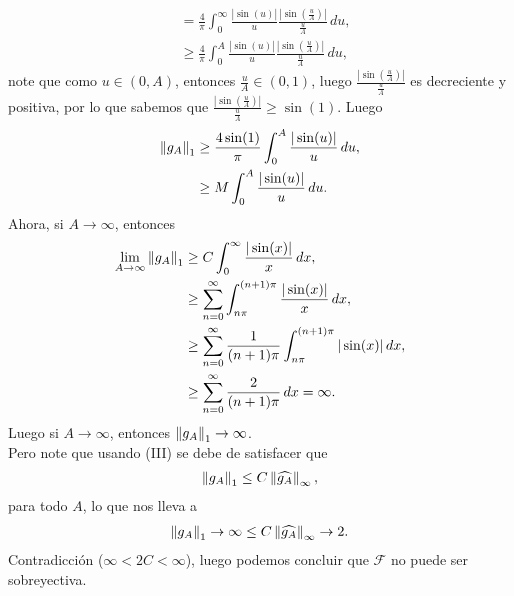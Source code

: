 \begin{homeworkProblem}
\begin{solution}
\begin{enumerate}[(i)]
\begin{align*}
          &=\frac{4}{\pi} \int_{0}^{\infty}\frac{|\sin(u)|}{u}\frac{\left| \sin(\frac{u}{A}) \right|}{\frac{u}{A}}\, du,\\
          &\geq \frac{4}{\pi}\int_{0}^{A}\frac{|\sin(u)|}{u}\frac{\left| \sin(\frac{u}{A}) \right|}{\frac{u}{A}}\, du,
        \end{align*}
        note que como $u\in (0,A)$, entonces $\frac{u}{A}\in(0,1)$, luego $\frac{|\sin\left( \frac{u}{A} \right)|}{\frac{u}{A}}$ es decreciente y positiva, por lo que sabemos que $\frac{|\sin\left( \frac{u}{A} \right)|}{\frac{u}{A}}\geq \sin(1)$. Luego
        \begin{align*}
          \left\|g_A\right\|_{1}&\geq \frac{4\sin(1)}{\pi}\int_{0}^{A}\frac{|\sin(u)|}{u}\, du,\\
          &\geq M \int_{0}^{A}\frac{|\sin(u)|}{u}\, du.
        \end{align*}
        Ahora, si $A\to\infty$, entonces
        \begin{align*}
          \lim_{A \to \infty}\left\|g_A\right\|_{1}&\geq C \int_{0}^{\infty}\frac{|\sin(x)|}{x}\, dx,\\
          &\geq \sum_{n=0}^{\infty}\int_{n\pi}^{(n+1)\pi}\frac{|\sin(x)|}{x}\, dx,\\
          &\geq\sum_{n=0}^{\infty}\frac{1}{(n+1)\pi}\int_{n\pi}^{(n+1)\pi}|\sin(x)|\, dx,\\
          &\geq\sum_{n=0}^{\infty}\frac{2}{(n+1)\pi}\, dx = \infty.
        \end{align*}
        Luego si $A\to \infty$, entonces $\left\|g_A\right\|_{1}\to\infty$.\\
        Pero note que usando (III) se debe de satisfacer que
        \begin{align*}
          \left\|g_A\right\|_{1}\leq C\left\|\widehat{g_A}\right\|_{\infty},
        \end{align*}
        para todo $A$, lo que nos lleva a
        \begin{align*}
          \left\|g_A\right\|_{1}\to \infty \leq C\left\|\widehat{g_A}\right\|_{\infty}\to 2.
        \end{align*}
        Contradicción ($\infty < 2C < \infty $), luego podemos concluir que $\mathcal{F}$ no puede ser sobreyectiva. 
    \end{enumerate}
  \end{solution}
\end{homeworkProblem}
